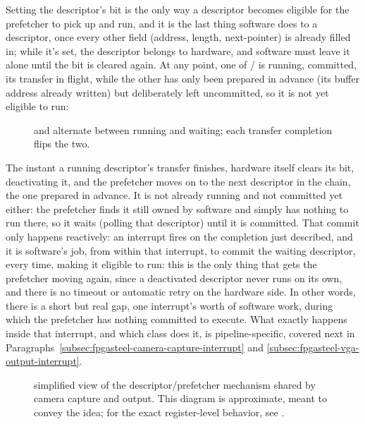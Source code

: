 Setting the descriptor's bit  is the only way a descriptor becomes eligible for the prefetcher to pick up and run, and it is the last thing software does to a descriptor, once every other field (address, length, next-pointer) is already filled in; while it's set, the descriptor belongs to hardware, and software must leave it alone until the bit is cleared again. At any point, one of / is running, committed, its transfer in flight, while the other has only been prepared in advance (its buffer address already written) but deliberately left uncommitted, so it is not yet eligible to run:

\begin{figure}[htbp]
    \centering
    
    \caption{ and  alternate between running and waiting; each transfer completion flips the two.}
    \label{fig:fpgasteel-descriptor-ping-pong}
\end{figure}

The instant a running descriptor's transfer finishes, hardware itself clears its  bit, deactivating it, and the prefetcher moves on to the next descriptor in the chain, the one prepared in advance. It is not already running and not committed yet either: the prefetcher finds it still owned by software and simply has nothing to run there, so it waits (polling that descriptor) until it is committed. That commit only happens reactively: an interrupt fires on the completion just described, and it is software's job, from within that interrupt, to commit the waiting descriptor, every time, making it eligible to run: this is the only thing that gets the prefetcher moving again, since a deactivated descriptor never runs on its own, and there is no timeout or automatic retry on the hardware side. In other words, there is a short but real gap, one interrupt's worth of software work, during which the prefetcher has nothing committed to execute. What exactly happens inside that interrupt, and which class does it, is pipeline-specific, covered next in Paragraphs~\ref{subsec:fpgasteel-camera-capture-interrupt} and \ref{subsec:fpgasteel-vga-output-interrupt}.

\begin{figure}[htbp]
    \centering
    
    \caption[simplified view of the descriptor/prefetcher mechanism shared by camera capture and  output.]{simplified view of the descriptor/prefetcher mechanism shared by camera capture and  output. This diagram is approximate, meant to convey the idea; for the exact register-level behavior, see \cite{EP-IPUG}.}
    \label{fig:fpgasteel-descriptor-prefetcher}
\end{figure}

